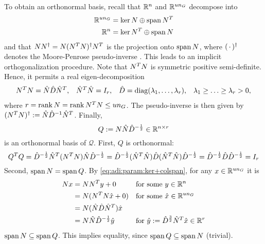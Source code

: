 To obtain an orthonormal basis,
recall that $\mathbb{R}^n$ and $\mathbb{R}^{un_G}$ decompose into
\begin{equation}
\label{eq:adi:param:ker+colspan}
\begin{aligned}
  \mathbb{R}^{un_G} = \ker N \oplus \operatorname{span} N^T \\
  \mathbb{R}^n = \ker N^T \oplus \operatorname{span} N
\end{aligned}
\end{equation}
and that $NN^\dagger = N (N^T N)^\dagger N^T$ is the projection onto $\operatorname{span} N$,
where $(\optional{})^\MP$ denotes the Moore-Penrose pseudo-inverse \cite{Strang2016}.
This leads to an implicit orthogonalization procedure.
Note that $N^T N$ is symmetric positive semi-definite.
Hence, it permits a real eigen-decomposition
\begin{align*}
  N^T N &= \hat N \hat D \hat N^T, &
  \hat N^T \hat N &= I_r, &
  \hat D &= \operatorname{diag}(\lambda_1, \ldots, \lambda_r), &
  \lambda_1 \geq \ldots \geq \lambda_r > 0,
\end{align*}
where $r = \operatorname{rank} N = \operatorname{rank} N^T N \leq u n_G$.
The pseudo-inverse is then given by $ (N^T N)^\dagger := \hat N \hat D^{-1} \hat N^T $.
Finally,
\begin{equation}
\label{eq:adi:param:Q}
  Q := N \hat N \hat D^{-\frac{1}{2}}
  \in\mathbb{R}^{n\times r}
\end{equation}
is an orthonormal basis of $\mathcal Q$.
First, $Q$ is orthonormal:
\begin{equation*}
  Q^T Q
  = \hat D^{-\frac{1}{2}} \hat N^T (N^T N) \hat N \hat D^{-\frac{1}{2}}
  = \hat D^{-\frac{1}{2}} (\hat N^T \hat N) \hat D (\hat N^T \hat N) \hat D^{-\frac{1}{2}}
  = \hat D^{-\frac{1}{2}} \hat D \hat D^{-\frac{1}{2}}
  = I_r
\end{equation*}
Second, $\operatorname{span} N = \operatorname{span} Q$.
By \eqref{eq:adi:param:ker+colspan},
for any $x\in\mathbb{R}^{un_G}$ it is
\begin{align*}
  Nx
  &= NN^T y + 0 &&\text{for some $y\in\mathbb{R}^n$} \\
  &= N(N^T N \hat x + 0) && \text{for some $\hat x \in\mathbb{R}^{un_G}$} \\
  &= N (\hat N \hat D \hat N^T) \hat x \\
  &= N \hat N \hat D^{-\frac{1}{2}} \hat y && \text{for $\hat y := \hat D^{\frac{3}{2}} \hat N^T \hat x \in \mathbb{R}^r$}
\end{align*}
\ie $\operatorname{span} N \subseteq \operatorname{span} Q$.
This implies equality,
since $\operatorname{span} Q \subseteq \operatorname{span} N$ (trivial).

